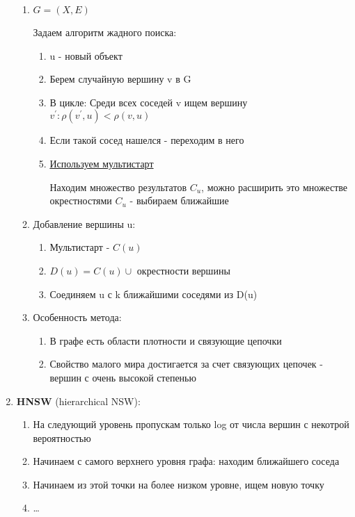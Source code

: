 \documentclass[a4paper, 12pt]{article}
\begin{document}
\begin{enumerate}
\begin{enumerate}
        \item \(G = (X, E)\)
        
        Задаем алгоритм жадного поиска:
        \begin{enumerate}
            \item u - новый объект
            \item Берем случайную вершину v в G
            \item В цикле: Среди всех соседей v ищем
            вершину $v^{\prime}: \rho(v^{\prime}, u) < \rho(v, u)$
            \item Если такой сосед нашелся - переходим в него
            \item \underline{Используем мультистарт}
            
            Находим множество результатов $C_u$, можно расширить 
            это множестве окрестностями $C_u$ - выбираем ближайшие
        \end{enumerate}

        \item Добавление вершины u:
        \begin{enumerate}
            \item Мультистарт - $C(u)$
            \item $D(u) = C(u) \cup $ окрестности вершины
            \item Соединяем u с k ближайшими соседями из D(u)
        \end{enumerate}

        \item Особенность метода:
        \begin{enumerate}
            \item В графе есть области плотности и
            связующие цепочки
            \item Свойство малого мира достигается за счет
            связующих цепочек - вершин с очень высокой степенью
        \end{enumerate}
    \end{enumerate}
    \item \textbf{HNSW} (hierarchical NSW):
    \begin{enumerate}
        \item На следующий уровень пропускам только log от числа
        вершин с некотрой вероятностью
        \item Начинаем с самого верхнего уровня графа: 
        находим ближайшего соседа
        \item Начинаем из этой точки на более низком уровне,
        ищем новую точку
        \item \dots
    \end{enumerate}
\end{enumerate}
\end{document}
